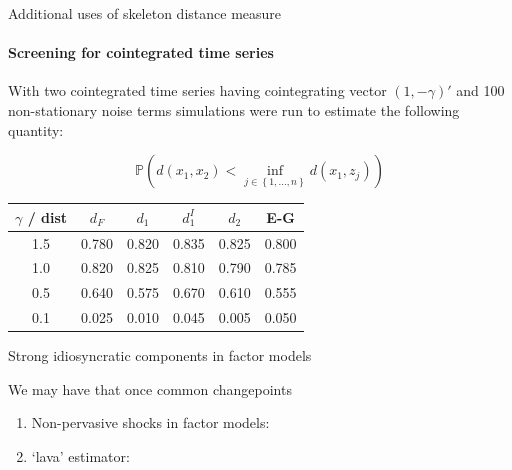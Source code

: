 \documentclass{beamer}
\begin{document}
\begin{frame}{Additional uses of skeleton distance measure}
\framesubtitle{Screening for cointegrated time series}

With two cointegrated time series having cointegrating vector $\left ( 1 , -\gamma \right ) '$ and 100 non-stationary noise terms simulations were run to estimate the following quantity:  

\begin{equation*}
    \mathbb{P}\left ( d(x_1,x_2) < \underset{j\in \left \{ 1, \dots ,n \right \}}{\inf} d(x_1,z_j) \right )
\end{equation*} 

\bigskip

\begin{table}[H]
    \centering
    \begin{tabular}{|c|c|c|c|c|c|}
    \hline
    $\gamma$ / dist & $d_F$&$d_1$&$d_1^I$&$d_2$&E-G \\
     \hline
    1.5 & 0.780 & 0.820 & 0.835 & 0.825 & 0.800 \\
    1.0 & 0.820 & 0.825 & 0.810 & 0.790 & 0.785 \\
    0.5 & 0.640 & 0.575 & 0.670 & 0.610 & 0.555 \\
    0.1 & 0.025 & 0.010 & 0.045 & 0.005 & 0.050 \\
    \hline
    \end{tabular}
\end{table}

\end{frame}




\begin{frame}{Strong idiosyncratic components in factor models}

We may have that once common changepoints 

\begin{enumerate}
    \item Non-pervasive shocks in factor models: \cite{luciani2014forecasting}
    \item `lava' estimator: \cite{chernozhukov2017lava}
\end{enumerate}

\end{frame}



\end{document}
